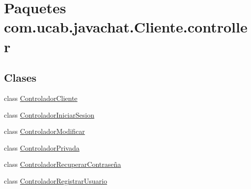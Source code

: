 \hypertarget{namespacecom_1_1ucab_1_1javachat_1_1_cliente_1_1controller}{\section{Paquetes com.\-ucab.\-javachat.\-Cliente.\-controller}
\label{namespacecom_1_1ucab_1_1javachat_1_1_cliente_1_1controller}
}
\subsection*{Clases}
\begin{DoxyCompactItemize}
\item 
class \hyperlink{classcom_1_1ucab_1_1javachat_1_1_cliente_1_1controller_1_1_controlador_cliente}{Controlador\-Cliente}
\item 
class \hyperlink{classcom_1_1ucab_1_1javachat_1_1_cliente_1_1controller_1_1_controlador_iniciar_sesion}{Controlador\-Iniciar\-Sesion}
\item 
class \hyperlink{classcom_1_1ucab_1_1javachat_1_1_cliente_1_1controller_1_1_controlador_modificar}{Controlador\-Modificar}
\item 
class \hyperlink{classcom_1_1ucab_1_1javachat_1_1_cliente_1_1controller_1_1_controlador_privada}{Controlador\-Privada}
\item 
class \hyperlink{classcom_1_1ucab_1_1javachat_1_1_cliente_1_1controller_1_1_controlador_recuperar_contrase_xC3_xB1a}{Controlador\-Recuperar\-Contraseña}
\item 
class \hyperlink{classcom_1_1ucab_1_1javachat_1_1_cliente_1_1controller_1_1_controlador_registrar_usuario}{Controlador\-Registrar\-Usuario}
\end{DoxyCompactItemize}
